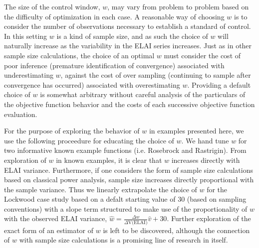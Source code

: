 \documentclass{article}
\begin{document}
%
The size of the control window, $w$, may vary from problem to problem based on 
the difficulty of optimization in each case. A reasonable way of choosing $w$ 
is to consider the number of observations necessary to establish a standard of 
control. In this setting $w$ is a kind of sample size, and as such the 
choice of $w$ will naturally increase as the variability in the ELAI series 
increases. Just as in other sample size calculations, the choice of an optimal 
$w$ must consider the cost of poor inference (premature identification of 
convergence) associated with underestimating $w$, against the cost of over 
sampling (continuing to sample after convergence has occurred) associated with 
overestimating $w$. Providing a default choice of $w$ is somewhat arbitrary 
without careful analysis of the particulars of the objective function behavior 
and the costs of each successive objective function evaluation. 

%
For the purpose of exploring the behavior of $w$ in examples presented here, 
we use the following proceedure for educating the choice of $w$. We hand tune 
$w$ for two informative known example functions (i.e. Rosebrock and 
Rastrigin). From exploration of $w$ in known examples, it is clear that $w$ 
increases directly with ELAI variance. Furthermore, if one considers the form 
of sample size calculations based on classical power analysis, sample size 
increases directly proportional with the sample variance. Thus we linearly 
extrapolate the choice of $w$ for the Lockwood case study based on a defalt 
starting value of 30 (based on sampling conventions) with a slope term 
structured to make use of the proportionality of $w$ with the observed ELAI 
variance, $\hat w=\frac{\Delta w}{\Delta \text{V(ELAI)}}\hat v+30$. Further 
exploration of the exact form of an estimator of $w$ is left to be discovered, 
although the connection of $w$ with sample size calculations is a promising 
line of research in itself. 

% 
% 
% 
\end{document}
